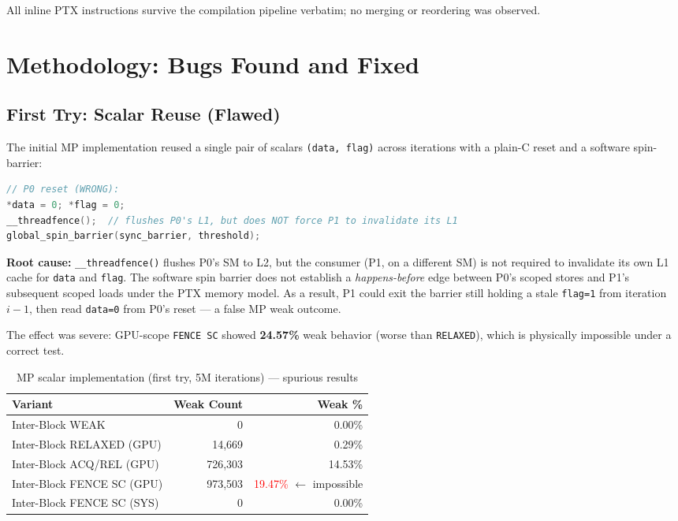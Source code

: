 \documentclass[a4paper]{article}
\begin{document}
All inline PTX instructions survive the compilation pipeline verbatim; no merging or reordering was observed.

\section{Methodology: Bugs Found and Fixed}
\label{sec:methodology}

\subsection{First Try: Scalar Reuse (Flawed)}

The initial MP implementation reused a single pair of scalars \texttt{(data, flag)} across iterations with a plain-C reset and a software spin-barrier:

\begin{lstlisting}[language=C]
// P0 reset (WRONG):
*data = 0; *flag = 0;
__threadfence();  // flushes P0's L1, but does NOT force P1 to invalidate its L1
global_spin_barrier(sync_barrier, threshold);
\end{lstlisting}

\textbf{Root cause:} \texttt{\_\_threadfence()} flushes P0's SM to L2, but the consumer (P1, on a different SM) is not required to invalidate its own L1 cache for \texttt{data} and \texttt{flag}.
The software spin barrier does not establish a \emph{happens-before} edge between P0's scoped stores and P1's subsequent scoped loads under the PTX memory model.
As a result, P1 could exit the barrier still holding a stale \texttt{flag=1} from iteration $i-1$, then read \texttt{data=0} from P0's reset — a false MP weak outcome.

The effect was severe: GPU-scope \texttt{FENCE SC} showed \textbf{24.57\%} weak behavior (worse than \texttt{RELAXED}), which is physically impossible under a correct test.

\begin{table}[h]
\centering
\small
\caption{MP scalar implementation (first try, 5M iterations) — spurious results}
\label{tab:mp-scalar}
\begin{tabular}{lrr}
\toprule
\textbf{Variant} & \textbf{Weak Count} & \textbf{Weak \%} \\
\midrule
Inter-Block WEAK           &         0 &  0.00\% \\
Inter-Block RELAXED (GPU)  &    14,669 &  0.29\% \\
Inter-Block ACQ/REL (GPU)  &   726,303 & 14.53\% \\
Inter-Block FENCE SC (GPU) &   973,503 & \textcolor{red}{19.47\%} $\leftarrow$ impossible \\
Inter-Block FENCE SC (SYS) &         0 &  0.00\% \\
\bottomrule
\end{tabular}
\end{table}
\end{document}
